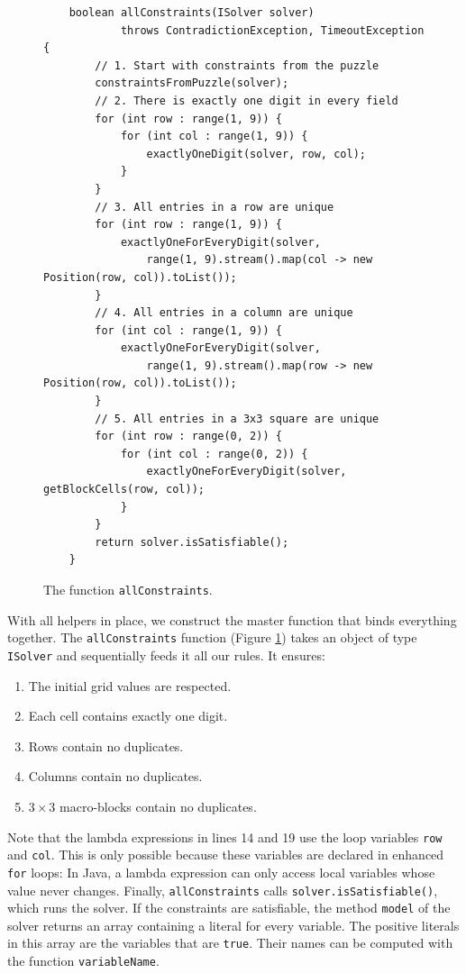 \begin{figure}[!ht]
  \centering
\begin{verbatim}
    boolean allConstraints(ISolver solver)
            throws ContradictionException, TimeoutException {
        // 1. Start with constraints from the puzzle
        constraintsFromPuzzle(solver);
        // 2. There is exactly one digit in every field
        for (int row : range(1, 9)) {
            for (int col : range(1, 9)) {
                exactlyOneDigit(solver, row, col);
            }
        }
        // 3. All entries in a row are unique
        for (int row : range(1, 9)) {
            exactlyOneForEveryDigit(solver,
                range(1, 9).stream().map(col -> new Position(row, col)).toList());
        }
        // 4. All entries in a column are unique
        for (int col : range(1, 9)) {
            exactlyOneForEveryDigit(solver,
                range(1, 9).stream().map(row -> new Position(row, col)).toList());
        }
        // 5. All entries in a 3x3 square are unique
        for (int row : range(0, 2)) {
            for (int col : range(0, 2)) {
                exactlyOneForEveryDigit(solver, getBlockCells(row, col));
            }
        }
        return solver.isSatisfiable();
    }
\end{verbatim}
\vspace*{-0.3cm}
  \caption{The function \texttt{allConstraints}.}
  \label{fig:sat4j-allConstraints}
\end{figure}

\noindent
With all helpers in place, we construct the master function that binds everything together.
The \texttt{allConstraints} function (Figure \ref{fig:sat4j-allConstraints}) takes an
object of type \texttt{ISolver} and sequentially feeds it all our rules. It ensures: 
\begin{enumerate}
    \item The initial grid values are respected.
    \item Each cell contains exactly one digit.
    \item Rows contain no duplicates.
    \item Columns contain no duplicates.
    \item $3 \times 3$ macro-blocks contain no duplicates.
\end{enumerate}
Note that the lambda expressions in lines 14 and 19 use the loop variables \texttt{row} and \texttt{col}.  This
is only possible because these variables are declared in enhanced \texttt{for} loops:  In Java, a lambda
expression can only access local variables whose value never changes.
Finally, \texttt{allConstraints} calls \texttt{solver.isSatisfiable()}, which runs the solver.  If the
constraints are satisfiable, the method \texttt{model} of the solver returns an array containing a literal for
every variable.  The positive literals in this array are the variables that are \texttt{true}.  Their names can
be computed with the function \texttt{variableName}.

